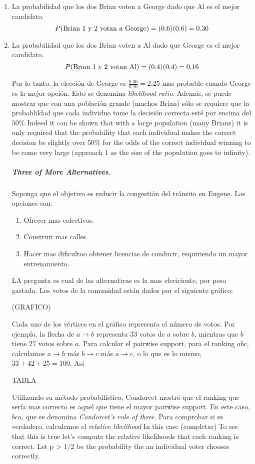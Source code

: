  \begin{enumerate}
 \item La probabilidad que los dos Brian voten a George dado que Al es el mejor candidato.
 $$P(\textnormal{Brian 1 y 2 votan a George})=(0.6)(0.6)=0.36$$
 \item La probabilidad que los dos Brian voten a Al dado que George es el mejor candidato.
 $$P(\textnormal{Brian 1 y 2 votan Al}) = (0.4) (0.4) = 0.16$$
 
 
Por lo tanto, la elección de George es $\frac{0.36}{0.16}=2.25$ mas probable cuando George es la mejor opción. Esto se denomina \textit{likelihood ratio}. Además, se puede mostrar que con una población grande (muchos Brian) sólo se requiere que la probablildad que cada individuo tome la decisión correcta esté por encima del $50\%$
Indeed it can be shown that with a large population (many Brians) it is only required that the probability that
each individual makes the correct decision be slightly over $50\%$ for the odds of the correct individual winning to be come very large (approach 1 as the size of the population goes to infinity).
\subparagraph{Three of More Alternatives.} Soponga que el objetivo es reducir la congestión del tránsito en Eugene. Las opciones son:
\begin{enumerate}
 \item Ofrecer mas colectivos.
 \item Construir mas calles.
 \item Hacer mas dificultoo obtener licencias de conducir, requiriendo un mayor entrenamiento.
\end{enumerate}
LA pregunta es cual de las alternativas es la mas efeciciente, por peso gastado. Los votos de la comunidad están dados por el siguiente gráfico:
 
 (GRAFICO)
 
 Cada uno de los vértices en el gráfico representa el número de votos. Por ejemplo, la flecha de $a \rightarrow b$ representa 33 votos de $a$ sobre $b$, mientras que $b$ tiene 27 votos sobre $a$. Para calcular el pairwise support, para el ranking $abc$, calculamos $a \rightarrow b$ más $b \rightarrow c$ más $a \rightarrow c$, o lo que es lo mismo, $33+42+25=100$.
 Así
 
 TABLA
 
 Utilizando su método probabilístico, Condorcet mostró que el ranking que sería mas correcto es aquel que tiene el mayor pairwise support. En este caso, $bca$, que se denomina \textit{Condorcet’s rule of three}. Para comprobar si es verdadero, calculemos el \textit{relative likelihood}  
 In this case
(completar) To see that this is true let’s compute the relative likelihoods that each ranking is correct. Let p > 1/2
be the probability the an individual voter chooses correctly.
\end{enumerate}
​
